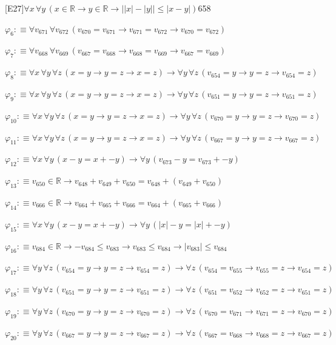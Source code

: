 \begin{fullproof}{[E27]}{$\forall x\,\forall y\,(x \in \mathbb{R} \to y \in \mathbb{R} \to \lvert \lvert x \rvert - \lvert y \rvert \rvert \leq \lvert x - y \rvert)$}{658}
\begin{abbrevlist}
\item $\varphi_{6} :\equiv \forall v_{671}\,\forall v_{672}\,(v_{670} = v_{671} \to v_{671} = v_{672} \to v_{670} = v_{672})$
\item $\varphi_{7} :\equiv \forall v_{668}\,\forall v_{669}\,(v_{667} = v_{668} \to v_{668} = v_{669} \to v_{667} = v_{669})$
\item $\varphi_{8} :\equiv \forall x\,\forall y\,\forall z\,(x = y \to y = z \to x = z) \to \forall y\,\forall z\,(v_{654} = y \to y = z \to v_{654} = z)$
\item $\varphi_{9} :\equiv \forall x\,\forall y\,\forall z\,(x = y \to y = z \to x = z) \to \forall y\,\forall z\,(v_{651} = y \to y = z \to v_{651} = z)$
\item $\varphi_{10} :\equiv \forall x\,\forall y\,\forall z\,(x = y \to y = z \to x = z) \to \forall y\,\forall z\,(v_{670} = y \to y = z \to v_{670} = z)$
\item $\varphi_{11} :\equiv \forall x\,\forall y\,\forall z\,(x = y \to y = z \to x = z) \to \forall y\,\forall z\,(v_{667} = y \to y = z \to v_{667} = z)$
\item $\varphi_{12} :\equiv \forall x\,\forall y\,(x - y = x + -y) \to \forall y\,(v_{673} - y = v_{673} + -y)$
\item $\varphi_{13} :\equiv v_{650} \in \mathbb{R} \to v_{648} + v_{649} + v_{650} = v_{648} + (v_{649} + v_{650})$
\item $\varphi_{14} :\equiv v_{666} \in \mathbb{R} \to v_{664} + v_{665} + v_{666} = v_{664} + (v_{665} + v_{666})$
\item $\varphi_{15} :\equiv \forall x\,\forall y\,(x - y = x + -y) \to \forall y\,(\lvert x \rvert - y = \lvert x \rvert + -y)$
\item $\varphi_{16} :\equiv v_{684} \in \mathbb{R} \to -v_{684} \leq v_{683} \to v_{683} \leq v_{684} \to \lvert v_{683} \rvert \leq v_{684}$
\item $\varphi_{17} :\equiv \forall y\,\forall z\,(v_{654} = y \to y = z \to v_{654} = z) \to \forall z\,(v_{654} = v_{655} \to v_{655} = z \to v_{654} = z)$
\item $\varphi_{18} :\equiv \forall y\,\forall z\,(v_{651} = y \to y = z \to v_{651} = z) \to \forall z\,(v_{651} = v_{652} \to v_{652} = z \to v_{651} = z)$
\item $\varphi_{19} :\equiv \forall y\,\forall z\,(v_{670} = y \to y = z \to v_{670} = z) \to \forall z\,(v_{670} = v_{671} \to v_{671} = z \to v_{670} = z)$
\item $\varphi_{20} :\equiv \forall y\,\forall z\,(v_{667} = y \to y = z \to v_{667} = z) \to \forall z\,(v_{667} = v_{668} \to v_{668} = z \to v_{667} = z)$

\end{abbrevlist}
\end{fullproof}
